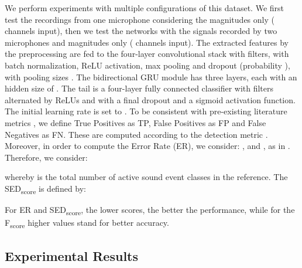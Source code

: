 \documentclass[lettersize,journal]{IEEEtran}
\begin{document}
We perform experiments with multiple configurations of this dataset. We first test the recordings from one microphone considering the magnitudes only ( channels input), then we test the networks with the signals recorded by two microphones and magnitudes only ( channels input). The extracted features by the preprocessing are fed to the four-layer convolutional stack with  filters, with batch normalization, ReLU activation, max pooling and dropout (probability ), with pooling sizes . The bidirectional GRU module has three layers, each with an hidden size of . The tail is a four-layer fully connected classifier with  filters alternated by ReLUs and with a final dropout and a sigmoid activation function. The initial learning rate is set to . To be consistent with pre-existing literature metrics , we define True Positives as TP, False Positives as FP and False Negatives as FN. These are computed according to the detection metric \cite{guizzo2021l3das21}. Moreover, in order to compute the Error Rate (ER), we consider: ,  and , as in \cite{Adavanne2019SoundEL, SED2021Mesaros}. Therefore, we consider:





\noindent whereby  is the total number of active sound event classes in the reference. The SED\textsubscript{score} is defined by:



For ER and SED\textsubscript{score}, the lower scores, the better the performance, while for the F\textsubscript{score} higher values stand for better accuracy.

\subsection{Experimental Results}
\end{document}
